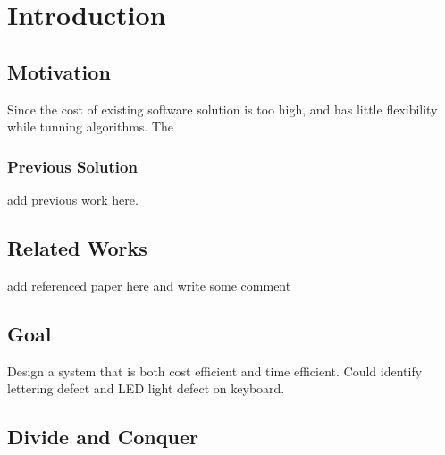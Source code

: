 \chapter{Introduction}
\label{c:intro}

\section{Motivation}
Since the cost of existing software solution is too high, and has little flexibility while tunning algorithms.
The

\subsection{Previous Solution}
add previous work here.



\section{Related Works}
\label{section:related-work}
add referenced paper here and write some comment

\section{Goal}
\label{section:goal}
Design a system that is both cost efficient and time efficient. Could identify lettering defect and LED light defect on keyboard.

\section{Divide and Conquer}



